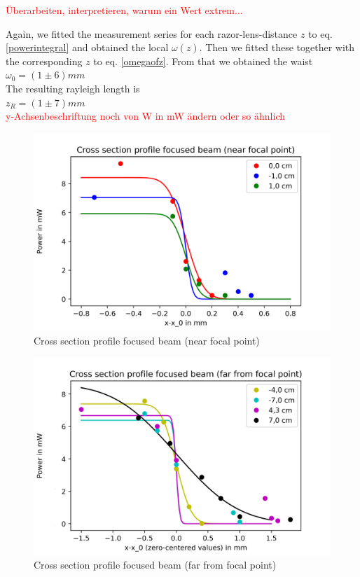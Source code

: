 \documentclass{article}
\begin{document}
\textcolor{red}{Überarbeiten, interpretieren, warum ein Wert extrem...}

Again, we fitted the measurement series for each razor-lens-distance $z$ to eq. \ref{powerintegral} and obtained the local $\omega(z)$. Then we fitted these together with the corresponding $z$ to eq. \ref{omegaofz}.
From that we obtained the waist\\ 
$\omega_{0} = ( 1 \pm 6 ) mm $\\
The resulting rayleigh length is\\
$z_{R} =  ( 1 \pm 7 ) mm $\\

\textcolor{red}{y-Achsenbeschriftung noch von W in mW ändern oder so ähnlich}

\begin{figure}[h!]
\includegraphics[width=\textwidth]{Cross section profile focused beam (near focal point).png} 
\caption{Cross section profile focused beam (near focal point)}
\label{near_focal} 
\end{figure}

\begin{figure}[h!]
\includegraphics[width=\textwidth]{Cross section profile focused beam (far from focal point).png}
\caption{Cross section profile focused beam (far from focal point)}
\label{far_focal}
\end{figure}
\end{document}

